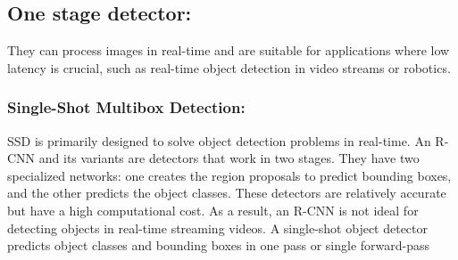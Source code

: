 \subsection{One stage detector: } 
They can process images in real-time and are suitable for applications where low latency is crucial, such as real-time object detection in video streams or robotics.

\subsubsection{Single-Shot Multibox Detection: }

SSD is primarily designed to solve object detection problems in real-time. An R-CNN and its variants are detectors that work in two stages. They have two specialized networks: one creates the region proposals to predict bounding boxes, and the other predicts the object classes. These detectors are relatively accurate but have a high computational cost. As a result, an R-CNN is not ideal for detecting objects in real-time streaming videos.
A single-shot object detector predicts object classes and bounding boxes in one pass or single forward-pass\cite{liu2016ssd} 
